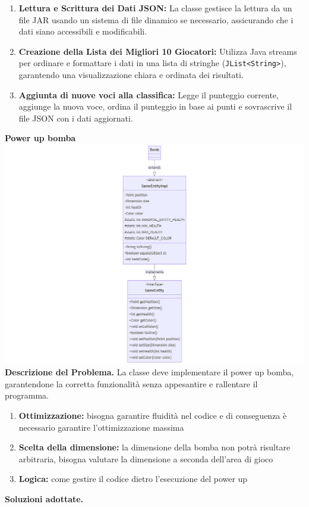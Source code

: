 \documentclass[a4paper,12pt]{report}
\begin{document}
\begin{enumerate}

\item \textbf{Lettura e Scrittura dei Dati JSON:} La classe gestisce la lettura da un file JAR usando un sistema di file dinamico se necessario, assicurando che i dati siano accessibili e modificabili.

\item \textbf{Creazione della Lista dei Migliori 10 Giocatori:} Utilizza Java streams per ordinare e formattare i dati in una lista di stringhe (\texttt{JList<String>}), garantendo una visualizzazione chiara e ordinata dei risultati.

\item \textbf{Aggiunta di nuove voci alla classifica:} Legge il punteggio corrente, aggiunge la nuova voce, ordina il punteggio in base ai punti e sovrascrive il file JSON con i dati aggiornati.

\end{enumerate}
\textbf{Power up bomba}\newline
\includegraphics[width=\textwidth]{bomb.png}\newline
\textbf{Descrizione del Problema.} La classe deve implementare il power up bomba, garantendone la corretta funzionalità senza appesantire e rallentare il programma.\newline
\begin{enumerate}
\item \textbf{Ottimizzazione:} bisogna garantire fluidità nel codice e di conseguenza è necessario garantire l'ottimizzazione massima
\item \textbf{Scelta della dimensione:} la dimensione della bomba non potrà risultare arbitraria, bisogna valutare la dimensione a seconda dell'area di gioco
\item \textbf{Logica:} come gestire il codice dietro l'esecuzione del power up
\end{enumerate}
\textbf{Soluzioni adottate.} \newline
\end{document}
